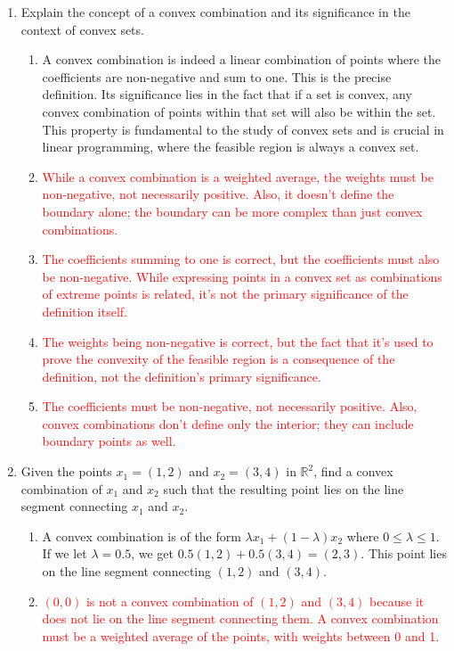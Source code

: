 \documentclass{article}%
\newcommand{\incorrect}[1]{\textcolor{red}{#1}}
\begin{document}
\begin{enumerate}
\begin{enumerate}
\end{enumerate}%
\vspace{1em}%
\item Explain the concept of a convex combination and its significance in the context of convex sets.%
\begin{enumerate}%
\item A convex combination is indeed a linear combination of points where the coefficients are non-negative and sum to one. This is the precise definition.  Its significance lies in the fact that if a set is convex, any convex combination of points within that set will also be within the set. This property is fundamental to the study of convex sets and is crucial in linear programming, where the feasible region is always a convex set.%
\item \incorrect{While a convex combination is a weighted average, the weights must be non-negative, not necessarily positive.  Also, it doesn't define the boundary alone; the boundary can be more complex than just convex combinations.}%
\item \incorrect{The coefficients summing to one is correct, but the coefficients must also be non-negative.  While expressing points in a convex set as combinations of extreme points is related, it's not the primary significance of the definition itself.}%
\item \incorrect{The weights being non-negative is correct, but the fact that it's used to prove the convexity of the feasible region is a consequence of the definition, not the definition's primary significance.}%
\item \incorrect{The coefficients must be non-negative, not necessarily positive.  Also, convex combinations don't define only the interior; they can include boundary points as well.}%
\end{enumerate}%
\vspace{1em}%
\item Given the points $x_1 = (1, 2)$ and $x_2 = (3, 4)$ in $\mathbb{R}^2$, find a convex combination of $x_1$ and $x_2$ such that the resulting point lies on the line segment connecting $x_1$ and $x_2$.%
\begin{enumerate}%
\item A convex combination is of the form $\lambda x_1 + (1 - \lambda)x_2$ where $0 \le \lambda \le 1$.  If we let $\lambda = 0.5$, we get $0.5(1, 2) + 0.5(3, 4) = (2, 3)$. This point lies on the line segment connecting $(1,2)$ and $(3,4)$.%
\item \incorrect{$(0, 0)$ is not a convex combination of $(1, 2)$ and $(3, 4)$ because it does not lie on the line segment connecting them.  A convex combination must be a weighted average of the points, with weights between 0 and 1.}%

\end{enumerate}
\end{enumerate}
\end{document}
